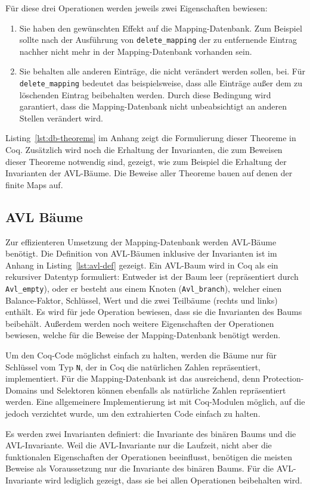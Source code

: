 \documentclass[a4paper, parskip]{scrartcl}
\begin{document}
Für diese drei Operationen werden jeweils zwei Eigenschaften bewiesen:
\begin{enumerate}
\item Sie haben den gewünschten Effekt auf die Mapping-Datenbank. Zum Beispiel sollte nach der Ausführung von \verb|delete_mapping| der zu entfernende Eintrag nachher nicht mehr in der Mapping-Datenbank vorhanden sein.
\item Sie behalten alle anderen Einträge, die nicht verändert werden sollen, bei. Für \verb|delete_mapping| bedeutet das beispielsweise, dass alle Einträge außer dem zu löschenden Eintrag beibehalten werden. Durch diese Bedingung wird garantiert, dass die Mapping-Datenbank nicht unbeabsichtigt an anderen Stellen verändert wird.
\end{enumerate}
Listing~\ref{lst:db-theorems} im Anhang zeigt die Formulierung dieser Theoreme in Coq.
Zusätzlich wird noch die Erhaltung der Invarianten, die zum Beweisen dieser Theoreme notwendig sind, gezeigt, wie zum Beispiel die Erhaltung der Invarianten der AVL-Bäume.
Die Beweise aller Theoreme bauen auf denen der finite Maps auf.

\subsection{AVL Bäume}
Zur effizienteren Umsetzung der Mapping-Datenbank werden AVL-Bäume benötigt.
Die Definition von AVL-Bäumen inklusive der Invarianten ist im Anhang in Listing~\ref{lst:avl-def} gezeigt.
Ein AVL-Baum wird in Coq als ein rekursiver Datentyp formuliert: Entweder ist der Baum leer (repräsentiert durch \verb|Avl_empty|), oder er besteht aus einem Knoten (\verb|Avl_branch|), welcher einen Balance-Faktor, Schlüssel, Wert und die zwei Teilbäume (rechts und links) enthält.
Es wird für jede Operation bewiesen, dass sie die Invarianten des Baums beibehält.
Außerdem werden noch weitere Eigenschaften der Operationen bewiesen, welche für die Beweise der Mapping-Datenbank benötigt werden.

Um den Coq-Code möglichst einfach zu halten, werden die Bäume nur für Schlüssel vom Typ \verb|N|, der in Coq die natürlichen Zahlen repräsentiert, implementiert.
Für die Mapping-Datenbank ist das ausreichend, denn Protection-Domains und Selektoren können ebenfalls als natürliche Zahlen repräsentiert werden.
Eine allgemeinere Implementierung ist mit Coq-Modulen möglich, auf die jedoch verzichtet wurde, um den extrahierten Code einfach zu halten.

Es werden zwei Invarianten definiert: die Invariante des binären Baums und die AVL-Invariante.
Weil die AVL-Invariante nur die Laufzeit, nicht aber die funktionalen Eigenschaften der Operationen beeinflusst, benötigen die meisten Beweise als Voraussetzung nur die Invariante des binären Baums.
Für die AVL-Invariante wird lediglich gezeigt, dass sie bei allen Operationen beibehalten wird.
\end{document}
